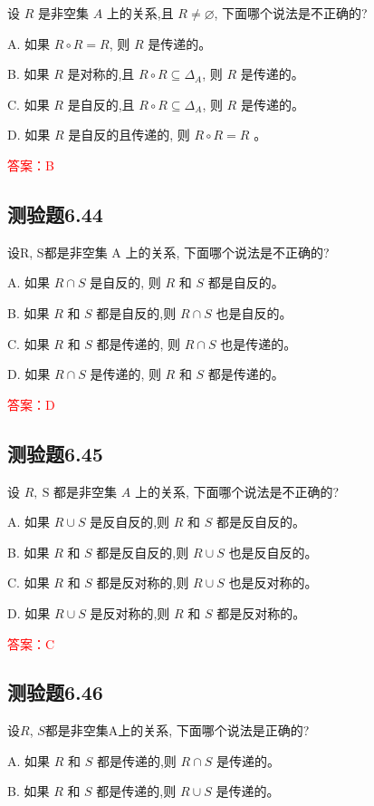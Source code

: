 \documentclass[UTF8, heading=true]{ctexart}
\begin{document}
设 $R$ 是非空集 $A$ 上的关系,且 $R \neq \varnothing$, 下面哪个说法是不正确的?

A. 
如果 $R \circ R=R$, 则 $R$ 是传递的。

B. 
如果 $R$ 是对称的,且 $R \circ R \subseteq \Delta_A$, 则 $R$ 是传递的。

C. 
如果 $R$ 是自反的,且 $R \circ R \subseteq \Delta_A$, 则 $R$ 是传递的。

D. 
如果 $R$ 是自反的且传递的, 则 $R \circ R=R$ 。

\textcolor{red}{答案：B}

\subsection{测验题6.44}

设R, S都是非空集 A 上的关系, 下面哪个说法是不正确的?

A. 
如果 $R \cap S$ 是自反的, 则 $R$ 和 $S$ 都是自反的。

B. 
如果 $R$ 和 $S$ 都是自反的,则 $R \cap S$ 也是自反的。

C. 
如果 $R$ 和 $S$ 都是传递的, 则 $R \cap S$ 也是传递的。

D. 
如果 $R \cap S$ 是传递的, 则 $R$ 和 $S$ 都是传递的。

\textcolor{red}{答案：D}

\subsection{测验题6.45}

设 $R, \mathrm{~S}$ 都是非空集 $A$ 上的关系, 下面哪个说法是不正确的?

A. 如果 $R \cup S$ 是反自反的,则 $R$ 和 $S$ 都是反自反的。

B. 如果 $R$ 和 $S$ 都是反自反的,则 $R \cup S$ 也是反自反的。

C. 如果 $R$ 和 $S$ 都是反对称的,则 $R \cup S$ 也是反对称的。

D. 如果 $R \cup S$ 是反对称的,则 $R$ 和 $S$ 都是反对称的。

\textcolor{red}{答案：C}


\subsection{测验题6.46}

设$R$, $S$都是非空集A上的关系, 下面哪个说法是正确的?

A. 
如果 $R$ 和 $S$ 都是传递的,则 $R \cap S$ 是传递的。

B. 
如果 $R$ 和 $S$ 都是传递的,则 $R \cup S$ 是传递的。
\end{document}
